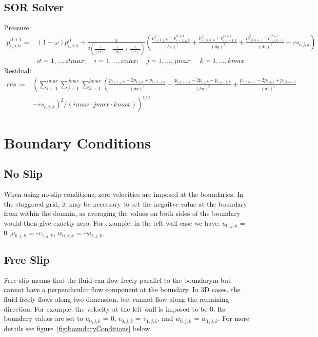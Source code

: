 \documentclass{article}%
\begin{document}
\subsection{SOR Solver}
Pressure:\\
\begin{equation}
\begin{split}
p^{it+1}_{i,j,k} = & (1 - \omega) p^{it}_{i,j,k} + \frac{\omega}{2 (\frac{1}{(\delta x)^2} + \frac{1}{(\delta y)^2} + \frac{1}{(\delta z)^2})} \left( \frac{p^{it}_{i+1,j,k} + p^{it+1}_{i-1,j,k}}{(\delta x)^2} + \frac{p^{it}_{i,j+1,k} + p^{it+1}_{i,j-1,k}}{(\delta y)^2} + \frac{p^{it}_{i,j,k+1} + p^{it+1}_{i,j,k-1}}{(\delta z)^2} - rs_{i,j,k} \right)\\
& it = 1,\ldots,itmax; \quad i = 1,\ldots,imax; \quad j = 1,\ldots,jmax; \quad k = 1,\ldots,kmax
\end{split}
\end{equation}
Residual:\\
\begin{equation}
\begin{split}
res := & \left( \sum_{i=1}^{imax} \sum_{j=1}^{jmax} \sum_{k=1}^{kmax} \left( \frac{p_{i+1,j,k} - 2 p_{i,j,k} + p_{i-1,j,k}}{(\delta x)^2} + \frac{p_{i,j+1,k} - 2 p_{i,j,k} + p_{i,j-1,k}}{(\delta y)^2} + \frac{p_{i,j,k+1} - 2 p_{i,j,k} + p_{i,j,k-1}}{(\delta z)^2} \right. \right. \\
& \left. \left. - rs_{i,j,k} \right)^2 / (imax \cdot jmax \cdot kmax) \right)^{1/2}
\end{split}
\end{equation}
\section{Boundary Conditions}
\subsection{No Slip} 
When using no-slip conditions, zero velocities are imposed at the boundaries. In the staggered grid, it may be necessary to set the negaitve value at the boundary from within the domain, as averaging the values on both sides of the boundary would then give exactly zero. For example, in the left wall case we have: $u_{0,j,k}$ = 0 ,$v_{0,j,k}$ = -$v_{1,j,k}$, $w_{0,j,k}$ = -$w_{1,j,k}$.
\subsection{Free Slip} 
Free-slip means that the fluid can flow freely parallel to the boundarym but cannot have a perpendicular flow component at the boundary. In 3D cases, the fluid freely flows along two dimension, but cannot flow along the remaining direction. For example, the velocity at the left wall is imposed to be 0. Its boundary values are set to $u_{0,j,k}$ = 0, $v_{0,j,k}$ = $v_{1,j,k}$, and $w_{0,j,k}$ = $w_{1,j,k}$. For more details see figure~\ref{fig:boundaryConditions} below.
\end{document}
